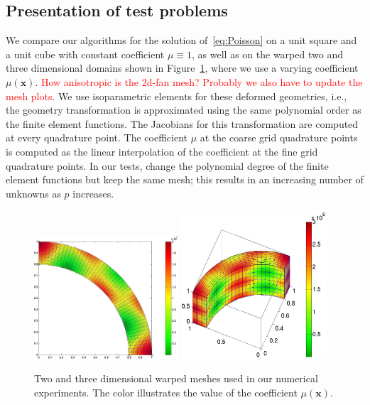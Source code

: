 \documentclass[smallcondensed,final]{svjour3}     %
\newcommand{\todo}[1]{\textcolor{red}{ #1}}
\newcommand{\bs}[1]{\ensuremath{\boldsymbol #1}}
\begin{document}
\subsection{Presentation of test problems}\label{subsec:tests}
We compare our algorithms for the solution of~\eqref{eq:Poisson} on a
unit square and a unit cube with constant coefficient $\mu\equiv 1$,
as well as on the warped two and three dimensional domains shown in
Figure~\ref{fig:mesh}, where we use a varying coefficient $\mu(\bs
x)$. \todo{How anisotropic is the 2d-fan mesh? Probably we also have
  to update the mesh plots.}  We use isoparametric elements for these
deformed geometries, i.e., the geometry transformation is approximated
using the same polynomial order as the finite element functions. The
Jacobians for this transformation are computed at every quadrature
point. The coefficient $\mu$ at the coarse grid quadrature points is
computed as the linear interpolation of the coefficient at the fine
grid quadrature points. In our tests, change the polynomial degree of
the finite element functions but keep the same mesh; this results in
an increasing number of unknowns as $p$ increases.

\begin{figure}
	\includegraphics[width=0.48\textwidth]{figs/fan}
	\includegraphics[width=0.48\textwidth]{figs/fan3a}
	\caption{\label{fig:mesh} Two and three dimensional warped
          meshes used in our numerical experiments. The color
          illustrates the value of the coefficient $\mu(\bs x)$.}
\end{figure}
\end{document}

